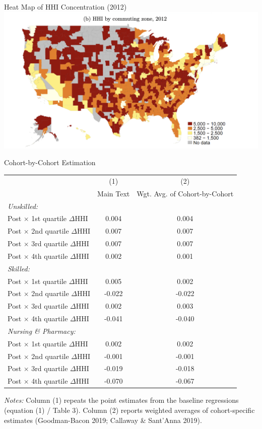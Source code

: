 \documentclass{beamer}
\begin{document}
\begin{frame}{Heat Map of HHI Concentration (2012)}
  \centering
  \includegraphics[width=0.8\linewidth,
                   height=0.8\textheight,
                   keepaspectratio]{hhi_concentration.png}
\end{frame}

\begin{frame}{Cohort-by-Cohort Estimation}
\scriptsize
\setlength{\tabcolsep}{5pt}
\renewcommand{\arraystretch}{0.9}

\begin{tabular}{lcc}
\toprule
& (1) & (2) \\
& Main Text & Wgt. Avg. of Cohort-by-Cohort \\
\midrule
\textit{Unskilled:} & & \\
Post $\times$ 1st quartile $\Delta$HHI & 0.004 & 0.004 \\
Post $\times$ 2nd quartile $\Delta$HHI & 0.007 & 0.007 \\
Post $\times$ 3rd quartile $\Delta$HHI & 0.007 & 0.007 \\
Post $\times$ 4th quartile $\Delta$HHI & 0.002 & 0.001 \\
\addlinespace
\textit{Skilled:} & & \\
Post $\times$ 1st quartile $\Delta$HHI & 0.005 & 0.002 \\
Post $\times$ 2nd quartile $\Delta$HHI & -0.022 & -0.022 \\
Post $\times$ 3rd quartile $\Delta$HHI & 0.002 & 0.003 \\
Post $\times$ 4th quartile $\Delta$HHI & -0.041 & -0.040 \\
\addlinespace
\textit{Nursing \& Pharmacy:} & & \\
Post $\times$ 1st quartile $\Delta$HHI & 0.002 & 0.002 \\
Post $\times$ 2nd quartile $\Delta$HHI & -0.001 & -0.001 \\
Post $\times$ 3rd quartile $\Delta$HHI & -0.019 & -0.018 \\
Post $\times$ 4th quartile $\Delta$HHI & -0.070 & -0.067 \\
\bottomrule
\end{tabular}

\medskip
\tiny\emph{Notes:} Column (1) repeats the point estimates from the baseline regressions (equation (1) / Table 3). Column (2) reports weighted averages of cohort-specific estimates (Goodman-Bacon 2019; Callaway \& Sant’Anna 2019).
\end{frame}
\end{document}
